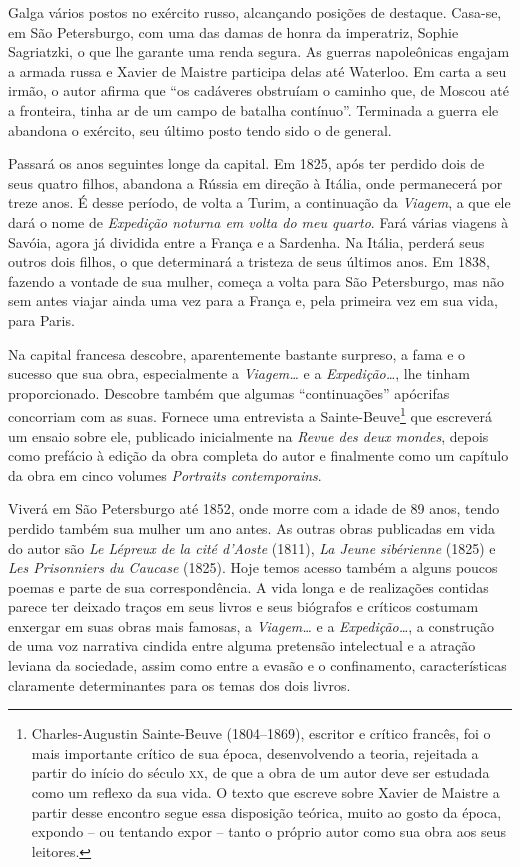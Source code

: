 Galga vários postos no exército russo, alcançando posições de destaque.
Casa-se, em São Petersburgo, com uma das damas de honra da imperatriz,
Sophie Sagriatzki, o que lhe garante uma renda segura. As guerras
napoleônicas engajam a armada russa e Xavier de Maistre participa delas
até Waterloo. Em carta a seu irmão, o autor afirma que ``os cadáveres
obstruíam o caminho que, de Moscou até a fronteira, tinha ar de um
campo de batalha contínuo''.  Terminada a guerra ele abandona o
exército, seu último posto tendo sido o de general. 

Passará os anos seguintes longe da capital. Em 1825, após ter perdido
dois de seus quatro filhos, abandona a Rússia em direção à Itália, onde
permanecerá por treze anos. É desse período, de volta a Turim, a
continuação da \textit{Viagem}, a que ele dará o nome de
\textit{Expedição noturna em volta do meu quarto}. Fará várias viagens
à Savóia, agora já dividida entre a França e a Sardenha. Na Itália,
perderá seus outros dois filhos, o que determinará a tristeza de seus
últimos anos. Em 1838, fazendo a vontade de sua mulher, começa a volta
para São Petersburgo, mas não sem antes viajar ainda uma vez para a
França e, pela primeira vez em sua vida, para Paris. 

Na capital francesa descobre, aparentemente bastante surpreso, a fama e
o sucesso que sua obra, especialmente a \textit{Viagem\ldots} e a
\textit{Expedição\ldots}, lhe tinham proporcionado. Descobre também que
algumas ``continuações'' apócrifas concorriam com as suas. Fornece uma
entrevista a Sainte-Beuve\footnote{ Charles-Augustin Sainte-Beuve
(1804--1869), escritor e crítico francês, foi o mais importante crítico
de sua época, desenvolvendo a teoria, rejeitada a partir do início do
século \textsc{xx}, de que a obra de um autor deve ser estudada como um reflexo
da sua vida. O texto que escreve sobre Xavier de Maistre a partir desse
encontro segue essa disposição teórica, muito ao gosto da época,
expondo -- ou tentando expor -- tanto o próprio autor como sua obra aos
seus leitores.} que escreverá um ensaio sobre ele, publicado
inicialmente na \textit{Revue des deux mondes}, depois como prefácio à
edição da obra completa do autor e finalmente como um capítulo da obra
em cinco volumes \textit{Portraits contemporains}. 

Viverá em São Petersburgo até 1852, onde morre com a idade de 89 anos,
tendo perdido também sua mulher um ano antes. As outras obras publicadas 
em vida do autor são \textit{Le Lépreux de la cité d’Aoste} (1811), \textit{La Jeune sibérienne} 
(1825) e \textit{Les Prisonniers du Caucase} (1825). Hoje temos acesso também a alguns 
poucos poemas e parte de sua correspondência.  
A vida longa e de realizações contidas parece ter deixado traços em seus
livros e seus biógrafos e críticos costumam enxergar em suas obras mais
famosas, a \textit{Viagem\ldots} e a \textit{Expedição\ldots}, a construção
de uma voz narrativa cindida entre alguma pretensão intelectual e a
atração leviana da sociedade, assim como entre a evasão e o
confinamento, características claramente determinantes para os temas
dos dois livros. 

